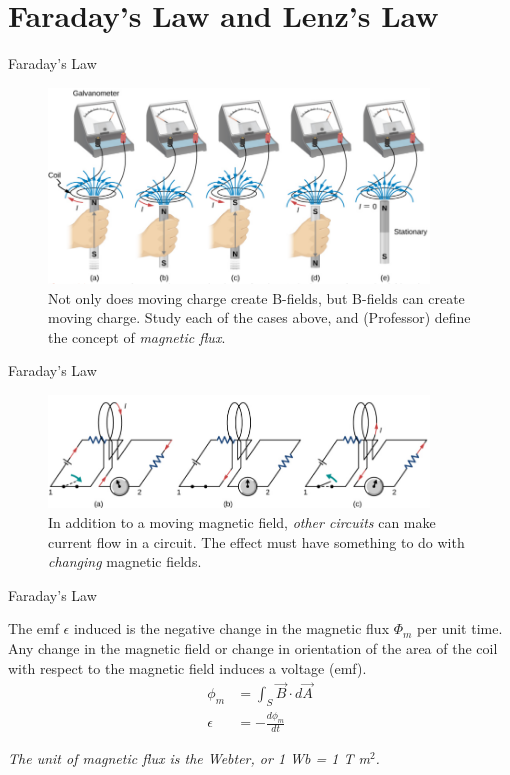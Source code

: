 \documentclass{beamer}
\begin{document}
\section{Faraday's Law and Lenz's Law}

\begin{frame}{Faraday's Law}
\begin{figure}
\centering
\includegraphics[width=0.9\textwidth]{figures/farad.png}
\caption{\label{fig:farad1} Not only does moving charge create B-fields, but B-fields can create moving charge.  Study each of the cases above, and (Professor) define the concept of \textit{magnetic flux}.}
\end{figure}
\end{frame}

\begin{frame}{Faraday's Law}
\begin{figure}
\centering
\includegraphics[width=0.9\textwidth]{figures/farad2.png}
\caption{\label{fig:farad2} In addition to a moving magnetic field, \textit{other circuits} can make current flow in a circuit.  The effect must have something to do with \textit{changing} magnetic fields.}
\end{figure}
\end{frame}

\begin{frame}{Faraday's Law}
\begin{tcolorbox}[colback=white,colframe=black!40!black,title=Faraday's Law]
\alert{The emf $\epsilon$ induced is the negative change in the magnetic flux $\Phi_m$ per unit time. Any change in the magnetic field
or change in orientation of the area of the coil with respect to the magnetic field induces a voltage (emf).
\begin{align}
\phi_m &= \int_S \vec{B} \cdot d\vec{A} \\
\epsilon &= - \frac{d\phi_m}{dt}
\label{eq:farad}
\end{align}}
\end{tcolorbox}
\textit{The unit of magnetic flux is the Webter, or 1 Wb = 1 T m$^2$.}
\end{frame}
\end{document}
